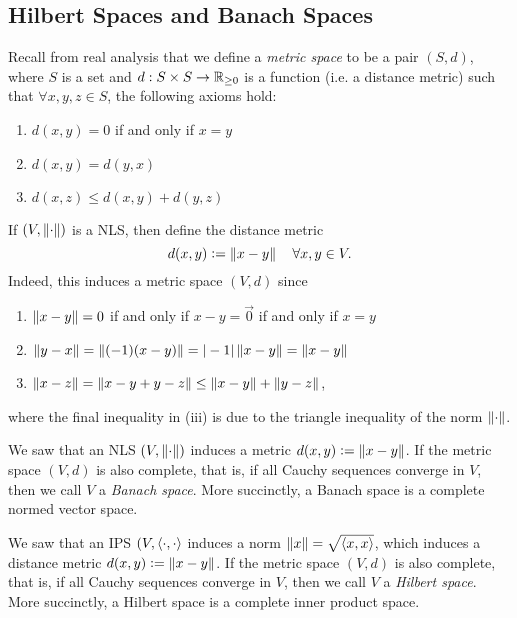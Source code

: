 \subsection{Hilbert Spaces and Banach Spaces}

\begin{definition}
\label{def:metric-space}
Recall from real analysis that we define a \textit{metric space} to be a pair $(S,d)$, where $S$ is a set and $d: S \times S \rightarrow \mathbb R_{\geq 0}$ is a function (i.e. a distance metric) such that $\forall x,y,z \in S$, the following axioms hold:
\begin{enumerate}[label=(\roman*)]
    \item $d(x,y)=0$ if and only if $x = y$
    \item $d(x,y) = d(y,x)$
    \item $d(x,z) \leq d(x,y) + d(y,z)$
\end{enumerate}
\end{definition}

\begin{note*}
If $(V, \left\lVert\cdot\right\rVert)$ is a NLS, then define the distance metric 
$$
d(x,y) \vcentcolon= \left\lVert x-y\right\rVert \quad \forall x,y \in V .
$$
Indeed, this induces a metric space $(V, d)$ since
\begin{enumerate}[label=(\roman*)]
    \item $\left\lVert x-y\right\rVert=0$ if and only if $x - y = \Vec{0}$ if and only if $x = y$
    \item $\left\lVert y-x\right\rVert = \left\lVert(-1)(x-y)\right\rVert = |-1|\left\lVert x-y\right\rVert = \left\lVert x-y\right\rVert$
    \item $\left\lVert x-z\right\rVert = \left\lVert x-y+y-z\right\rVert \leq \left\lVert x-y\right\rVert + \left\lVert y-z\right\rVert$,
\end{enumerate}
where the final inequality in (iii) is due to the triangle inequality of the norm $\left\lVert\cdot\right\rVert$.
\end{note*}

\begin{definition}
\label{def:banach-space}
We saw that an NLS $(V, \left\lVert\cdot\right\rVert)$ induces a metric $d(x,y) \vcentcolon= \left\lVert x-y\right\rVert$. If the metric space $(V,d)$ is also complete, that is, if all Cauchy sequences converge in $V$, then we call $V$ a \textit{Banach space}. More succinctly, a Banach space is a complete normed vector space.
\end{definition}

\begin{definition}
\label{def:hilbert-space}
We saw that an IPS $(V, \langle \cdot, \cdot\rangle$ induces a norm $\left\lVert x\right\rVert = \sqrt{\langle x, x\rangle}$, which induces a distance metric $d(x,y) \vcentcolon= \left\lVert x-y\right\rVert$. If the metric space $(V,d)$ is also complete, that is, if all Cauchy sequences converge in $V$, then we call $V$ a \textit{Hilbert space}. More succinctly, a Hilbert space is a complete inner product space.
\end{definition}

